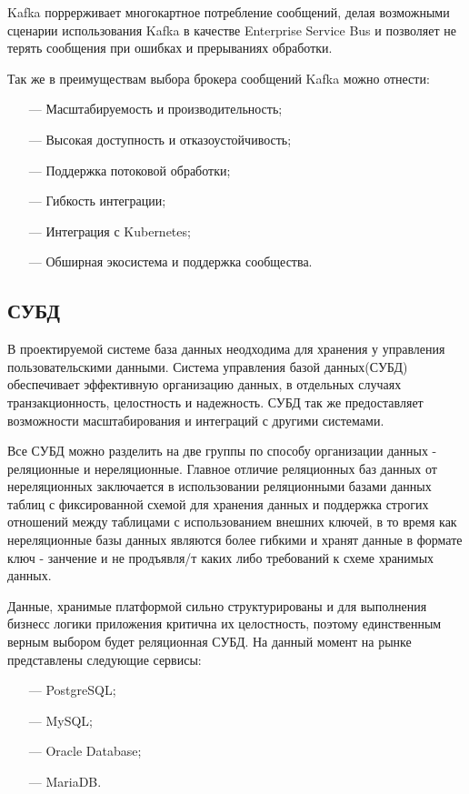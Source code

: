 Kafka поррерживает многокартное потребление сообщений, делая возможными сценарии использования Kafka в качестве Enterprise Service Bus\cite{menge2007enterprise} и позволяет не терять сообщения при ошибках и прерываниях обработки.

Так же в преимуществам выбора брокера сообщений Kafka можно отнести:

\begin{itemize}
  \item[---] Масштабируемость и производительность;
  \item[---] Высокая доступность и отказоустойчивость;
  \item[---] Поддержка потоковой обработки;
  \item[---] Гибкость интеграции;
  \item[---] Интеграция с Kubernetes;
  \item[---] Обширная экосистема и поддержка сообщества.
\end{itemize}

\subsection{СУБД}

В проектируемой системе база данных неодходима для хранения у управления пользовательскими данными. Система управления базой данных(СУБД) обеспечивает эффективную организацию данных, в отдельных случаях транзакционность, целостность и надежность. СУБД так же предоставляет возможности масштабирования и интеграций с другими системами.

Все СУБД можно разделить на две группы по способу организации данных - реляционные и нереляционные. Главное отличие реляционных баз данных от нереляционных заключается в использовании реляционными базами данных таблиц с фиксированной схемой для хранения данных и поддержка строгих отношений между таблицами с использованием внешних ключей, в то время как нереляционные базы данных являются более гибкими и хранят данные в формате ключ - занчение и не продъявля/т каких либо требований к схеме хранимых данных.

Данные, хранимые платформой сильно структурированы и для выполнения бизнесс логики приложения критична их целостность, поэтому единственным верным выбором будет реляционная СУБД. На данный момент на рынке представлены следующие сервисы:

\begin{itemize}
  \item[---] PostgreSQL;
  \item[---] MySQL;
  \item[---] Oracle Database;
  \item[---] MariaDB.
\end{itemize}

